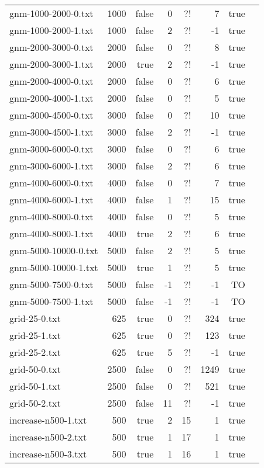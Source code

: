 \begin{tabular}{lrrrrrrr}
  gnm-1000-2000-0.txt & 1000 & false & 0 & ?! & 7 & true \\
  gnm-1000-2000-1.txt & 1000 & false & 2 & ?! & -1 & true \\
  gnm-2000-3000-0.txt & 2000 & false & 0 & ?! & 8 & true \\
  gnm-2000-3000-1.txt & 2000 & true & 2 & ?! & -1 & true \\
  gnm-2000-4000-0.txt & 2000 & false & 0 & ?! & 6 & true \\
  gnm-2000-4000-1.txt & 2000 & false & 0 & ?! & 5 & true \\
  gnm-3000-4500-0.txt & 3000 & false & 0 & ?! & 10 & true \\
  gnm-3000-4500-1.txt & 3000 & false & 2 & ?! & -1 & true \\
  gnm-3000-6000-0.txt & 3000 & false & 0 & ?! & 6 & true \\
  gnm-3000-6000-1.txt & 3000 & false & 2 & ?! & 6 & true \\
  gnm-4000-6000-0.txt & 4000 & false & 0 & ?! & 7 & true \\
  gnm-4000-6000-1.txt & 4000 & false & 1 & ?! & 15 & true \\
  gnm-4000-8000-0.txt & 4000 & false & 0 & ?! & 5 & true \\
  gnm-4000-8000-1.txt & 4000 & true & 2 & ?! & 6 & true \\
  gnm-5000-10000-0.txt & 5000 & false & 2 & ?! & 5 & true \\
  gnm-5000-10000-1.txt & 5000 & true & 1 & ?! & 5 & true \\
  gnm-5000-7500-0.txt & 5000 & false & -1 & ?! & -1 & TO \\
  gnm-5000-7500-1.txt & 5000 & false & -1 & ?! & -1 & TO \\
  grid-25-0.txt & 625 & true & 0 & ?! & 324 & true \\
  grid-25-1.txt & 625 & true & 0 & ?! & 123 & true \\
  grid-25-2.txt & 625 & true & 5 & ?! & -1 & true \\
  grid-50-0.txt & 2500 & false & 0 & ?! & 1249 & true \\
  grid-50-1.txt & 2500 & false & 0 & ?! & 521 & true \\
  grid-50-2.txt & 2500 & false & 11 & ?! & -1 & true \\
  increase-n500-1.txt & 500 & true & 2 & 15 & 1 & true \\
  increase-n500-2.txt & 500 & true & 1 & 17 & 1 & true \\
  increase-n500-3.txt & 500 & true & 1 & 16 & 1 & true \\

\end{tabular}
